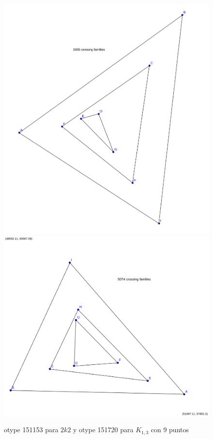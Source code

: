 \documentclass[11pt,epsf,times,letterpaper]{article}
\begin{document}
	\begin{figure}[!h]
		\includegraphics[scale=.125]{2k2/min9_otype151153.png}
		\includegraphics[scale=.25]{k13/min9_otype151720.png}
		\caption{otype 151153 para $2k2$ y otype 151720 para $K_{1,3}$ con 9 puntos}
	\end{figure}	
\end{document}
